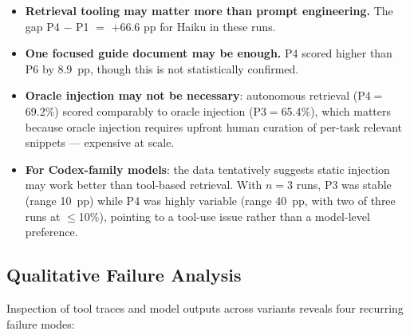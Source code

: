 \documentclass[10pt,a4paper,twocolumn]{article}
\begin{document}
\begin{itemize}
    \item \textbf{Retrieval tooling may matter more than prompt engineering.} The gap P4 $-$ P1 $=$ $+$66.6 pp for Haiku in these runs.
    \item \textbf{One focused guide document may be enough.} P4 scored higher than P6 by 8.9~pp, though this is not statistically confirmed.
    \item \textbf{Oracle injection may not be necessary}: autonomous retrieval (P4$=$69.2\%) scored comparably to oracle injection (P3$=$65.4\%), which matters because oracle injection requires upfront human curation of per-task relevant snippets --- expensive at scale.
    \item \textbf{For Codex-family models}: the data tentatively suggests static injection may work better than tool-based retrieval. With $n{=}3$ runs, P3 was stable (range 10~pp) while P4 was highly variable (range 40~pp, with two of three runs at $\leq$10\%), pointing to a tool-use issue rather than a model-level preference.
\end{itemize}

\subsection{Qualitative Failure Analysis}
\label{sec:qualitative}

Inspection of tool traces and model outputs across variants reveals four recurring failure modes:
\end{document}
